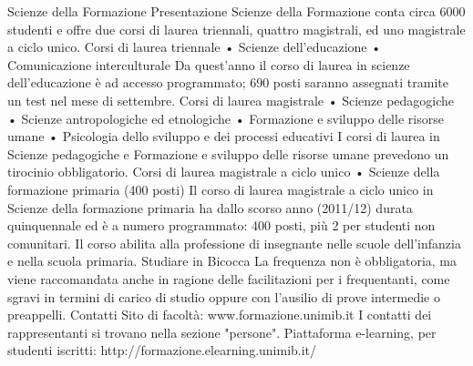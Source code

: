 Scienze della Formazione
Presentazione
Scienze della Formazione conta circa 6000 studenti e offre due corsi di laurea triennali, quattro magistrali, ed uno magistrale a ciclo unico. 
Corsi di laurea triennale
     • Scienze dell'educazione 
     • Comunicazione interculturale 
Da quest'anno il corso di laurea in scienze dell'educazione è ad accesso programmato; 690 posti saranno assegnati tramite un test nel mese di settembre. 
Corsi di laurea magistrale
     • Scienze pedagogiche 
     • Scienze antropologiche ed etnologiche 
     • Formazione e sviluppo delle risorse umane 
     • Psicologia dello sviluppo e dei processi educativi 
I corsi di laurea  in Scienze pedagogiche e Formazione e sviluppo delle risorse umane prevedono un tirocinio obbligatorio. 
Corsi di laurea magistrale a ciclo unico
     • Scienze della formazione primaria (400 posti) 
Il corso di laurea magistrale a ciclo unico in Scienze della formazione primaria ha dallo scorso anno (2011/12) durata quinquennale ed è a numero programmato: 400 posti, più 2 per studenti non comunitari. Il corso abilita alla professione di insegnante nelle scuole dell'infanzia e nella scuola primaria. 
Studiare in Bicocca
La frequenza non è obbligatoria, ma viene raccomandata anche in ragione delle facilitazioni per i frequentanti, come sgravi in termini di carico di studio oppure con l'ausilio di prove intermedie o preappelli. 
Contatti
Sito di facoltà: www.formazione.unimib.it 
I contatti dei rappresentanti si trovano nella sezione "persone". 
Piattaforma e-learning, per studenti iscritti: http://formazione.elearning.unimib.it/ 
